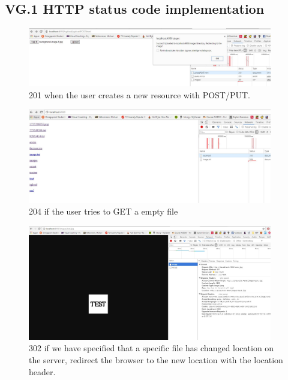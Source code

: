 \documentclass[a4paper,12pt]{article}
\numberwithin{figure}{section}
\begin{document}
\newpage
\subsection{VG.1 HTTP status code implementation}

\begin{figure}[h!]
	\centering
	\label{201}
	\includegraphics[width=0.95\textwidth,keepaspectratio]{img/201.jpg} 
	\caption{201 when the user creates a new resource with POST/PUT.}
\end{figure}

\begin{figure}[h!]
	\centering
	\label{204}
	\includegraphics[width=0.95\textwidth,keepaspectratio]{img/204.jpg} 
	\caption{204 if the user tries to GET a empty file}
\end{figure}

\begin{figure}[h!]
	\centering
	\label{302}
	\includegraphics[width=0.95\textwidth,keepaspectratio]{img/302.jpg} 
	\caption{302 if we have specified that a specific file has changed location on the server, redirect the browser to the new location with the location header.}
\end{figure}
\end{document}
